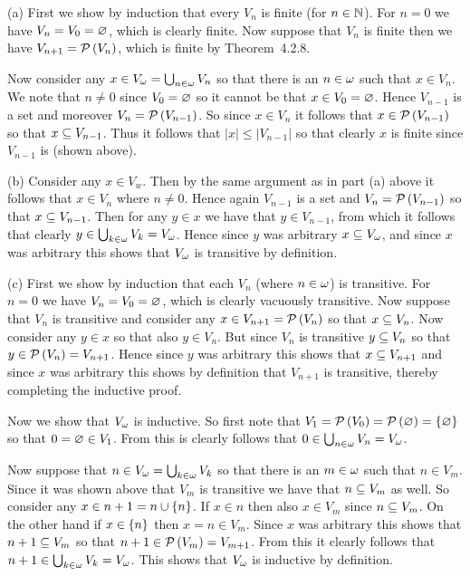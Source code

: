 
\begin{solution}
	(a) First we show by induction that every $V_n$ is finite (for $n \in \nats$).
    For $n=0$ we have $V_n = V_0 = \es$, which is clearly finite.
    Now suppose that $V_n$ is finite then we have $V_{n+1} = \pset{V_n}$, which is finite by Theorem~4.2.8.

    Now consider any $x \in V_\w = \bigcup_{n \in \w} V_n$ so that there is an $n \in \w$ such that $x \in V_n$.
    We note that $n \neq 0$ since $V_0 = \es$ so it cannot be that $x \in V_0 = \es$.
    Hence $V_{n-1}$ is a set and moreover $V_n = \pset{V_{n-1}}$.
    So since $x \in V_n$ it follows that $x \in \pset{V_{n-1}}$ so that $x \ss V_{n-1}$.
    Thus it follows that $|x| \leq |V_{n-1}|$ so that clearly $x$ is finite since $V_{n-1}$ is (shown above). \qedsymbol

    (b) Consider any $x \in V_w$.
    Then by the same argument as in part (a) above it follows that $x \in V_n$ where $n \neq 0$.
    Hence again $V_{n-1}$ is a set and $V_n = \pset{V_{n-1}}$ so that $x \ss V_{n-1}$.
    Then for any $y \in x$ we have that $y \in V_{n-1}$, from which it follows that clearly $y \in \bigcup_{k \in \w} V_k = V_\w$.
    Hence since $y$ was arbitrary $x \ss V_\w$, and since $x$ was arbitrary this shows that $V_\w$ is transitive by definition. \qedsymbol

    (c) First we show by induction that each $V_n$ (where $n \in \w$) is transitive.
    For $n=0$ we have $V_n = V_0 = \es$, which is clearly vacuously transitive.
    Now suppose that $V_n$ is transitive and consider any $x \in V_{n+1} = \pset{V_n}$ so that $x \ss V_n$.
    Now consider any $y \in x$ so that also $y \in V_n$.
    But since $V_n$ is transitive $y \ss V_n$ so that $y \in \pset{V_n} = V_{n+1}$.
    Hence since $y$ was arbitrary this shows that $x \ss V_{n+1}$ and since $x$ was arbitrary this shows by definition that $V_{n+1}$ is transitive, thereby completing the inductive proof.

    Now we show that $V_\w$ is inductive.
    So  first note that $V_1 = \pset{V_0} = \pset{\es} = \braces{\es}$ so that $0 = \es \in V_1$.
    From this is clearly follows that $0 \in \bigcup_{n \in \w} V_n = V_\w$.

    Now suppose that $n \in V_\w = \bigcup_{k \in \w} V_k$ so that there is an $m \in \w$ such that $n \in V_m$.
    Since it was shown above that $V_m$ is transitive we have that $n \ss V_m$ as well.
    So consider any $x \in n+1 = n \cup \braces{n}$.
    If $x \in n$ then also $x \in V_m$ since $n \ss V_m$.
    On the other hand if $x \in \braces{n}$ then $x = n \in V_m$.
    Since $x$ was arbitrary this shows that $n+1 \ss V_m$ so that $n+1 \in \pset{V_m} = V_{m+1}$.
    From this it clearly follows that $n+1 \in \bigcup_{k \in \w} V_k = V_\w$.
    This shows that $V_\w$ is inductive by definition. \qedsymbol
\end{solution}

